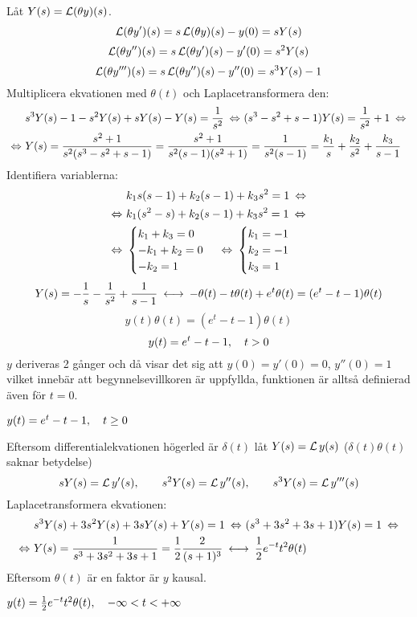 \pagebreak
\begin{task}{5.9}
	Låt $Y(s)=\operatorname{\mathcal{L}}(\theta y)(s)$.
	\[\operatorname{\mathcal{L}}(\theta y')(s)=s\operatorname{\mathcal{L}}(\theta y)(s)-y(0)=sY(s)\]
	\[\operatorname{\mathcal{L}}(\theta y'')(s)=s\operatorname{\mathcal{L}}(\theta y')(s)-y'(0)=s^2Y(s)\]
	\[\operatorname{\mathcal{L}}(\theta y''')(s)=s\operatorname{\mathcal{L}}(\theta y'')(s)-y''(0)=s^3Y(s)-1\]
	Multiplicera ekvationen med $\theta(t)$ och Laplacetransformera den:
	\begin{align*}
	&s^3Y(s)-1-s^2Y(s)+sY(s)-Y(s)=\frac{1}{s^2} \lra
	(s^3-s^2+s-1)Y(s)=\frac{1}{s^2}+1 \lra \\ \lra
	&Y(s)=\frac{s^2+1}{s^2(s^3-s^2+s-1)}=
	\frac{s^2+1}{s^2(s-1)(s^2+1)}=
	\frac{1}{s^2(s-1)}=
	\frac{k_1}{s}+\frac{k_2}{s^2}+\frac{k_3}{s-1}
	\end{align*}
	Identifiera variablerna:
	\begin{align*}
	&k_1s(s-1)+k_2(s-1)+k_3s^2=1 \lra \\ \lra
	&k_1(s^2-s)+k_2(s-1)+k_3s^2=1 \lra \\ \lra
	&\begin{cases}
	k_1+k_3=0 \\
	-k_1+k_2=0 \\
	-k_2=1
	\end{cases} \lra
	\begin{cases}
	k_1=-1 \\
	k_2=-1 \\
	k_3=1
	\end{cases}
	\end{align*}
	\begin{align*}
	Y(s)=-\frac{1}{s}-\frac{1}{s^2}+\frac{1}{s-1} \llra
	-\theta(t)-t\theta(t)+e^{t}\theta(t)=
	(e^{t}-t-1)\theta(t)
	\end{align*}
	\[y(t)\theta(t)=(e^{t}-t-1)\theta(t)\]
	\[y(t)=e^{t}-t-1, \quad t>0\]
	$y$ deriveras 2 gånger och då visar det sig att $y(0)=y'(0)=0$, $y''(0)=1$ vilket innebär att begynnelsevillkoren är uppfyllda, funktionen är alltså definierad även för $t=0$.
	
	\ans $y(t)=e^{t}-t-1, \quad t\ge0$
\end{task}

\begin{task}{5.10}
	Eftersom differentialekvationen högerled är $\delta(t)$ låt $Y(s)=\operatorname{\mathcal{L}} y(s)$ ($\delta(t)\theta(t)$ saknar betydelse)
	\[sY(s)=\operatorname{\mathcal{L}} y'(s),\qquad s^2Y(s)=\operatorname{\mathcal{L}} y''(s),\qquad s^3Y(s)=\operatorname{\mathcal{L}} y'''(s)\]
	Laplacetransformera ekvationen:
	\begin{align*}
	&s^3Y(s)+3s^2Y(s)+3sY(s)+Y(s)=1 \lra
	(s^3+3s^2+3s+1)Y(s)=1\lra \\ \lra
	&Y(s)=\frac{1}{s^3+3s^2+3s+1}=
	\frac{1}{2}\frac{2}{(s+1)^3}\llra
	\frac{1}{2}e^{-t}t^2\theta(t)
	\end{align*}
	Eftersom $\theta(t)$ är en faktor är $y$ kausal.
	
	\ans $y(t)=\frac{1}{2}e^{-t}t^2\theta(t), \quad -\infty<t<+\infty$
\end{task}

